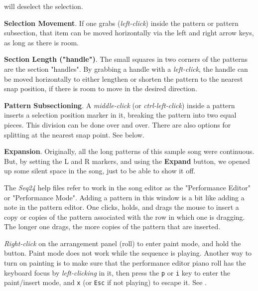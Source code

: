 \begin{enumber}
         will deselect the selection.
      \item \textbf{Selection Movement}.
         If one grabs (\textsl{left-click}) inside
         the pattern or pattern subsection, that item can be moved
         horizontally via the left and right arrow keys,
         as long as there is room.
      \item \textbf{Section Length ("handle")}.
         The small squares in two corners of the patterns are the section
         "handles".
         By grabbing a handle with a \textsl{left-click},
         the handle can be moved
         horizontally to either lengthen or shorten the pattern to the nearest
         snap position, if there is room to move in the desired direction.
      \item \textbf{Pattern Subsectioning}.
         A \textsl{middle-click} (or \textsl{ctrl-left-click})
         inside a pattern inserts a selection position
         marker in it, breaking the pattern into two equal pieces.
         This division can be done over and over.
         There are also options for splitting at the nearest snap point.
         See below.
      \item \textbf{Expansion}.
         Originally, all the long patterns of this sample song were continuous.
         But, by setting the L and R markers, and using the \textbf{Expand}
         button, we opened up some silent space in the song, just to be able
         to show it off.
   \end{enumber}

   The \textsl{Seq24} help files refer to work in the song editor as the
   "Performance Editor" or "Performance Mode".  Adding a pattern in this
   window is a bit like adding a note in the pattern editor.
   One clicks, holds, and drags the mouse to insert a copy or copies of the
   pattern associated with the row in which one is dragging.
   The longer one drags, the more copies of the pattern that are inserted.

   \textsl{Right-click} on the arrangement panel (roll) to enter
   paint mode, and hold the button.
   Paint mode does not work while the sequence is playing.
   Another way to turn on painting is to
   make sure that the performance editor piano roll has the
   keyboard focus by \textsl{left-clicking} in it, then press the
   \texttt{p} or \texttt{i} key to enter the paint/insert mode, and
   \texttt{x} (or \texttt{Esc} if not playing) to escape it.
   See .

